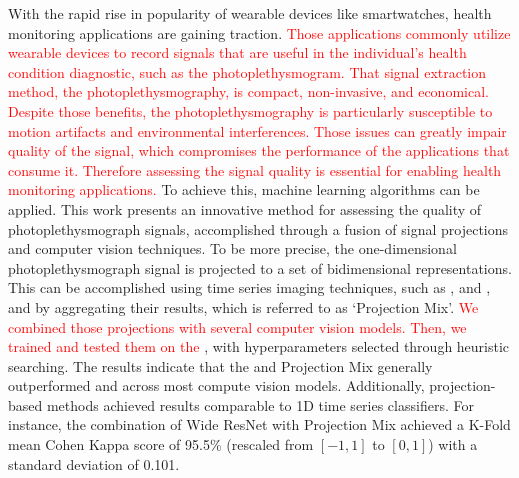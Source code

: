 
With the rapid rise in popularity of wearable devices like smartwatches, health monitoring applications are gaining traction. 
\textcolor{red}{Those applications commonly utilize wearable devices to record signals that are useful in the individual's health condition diagnostic, such as the photoplethysmogram. That signal extraction method, the photoplethysmography, is compact, non-invasive, and economical. Despite those benefits, the photoplethysmography is particularly susceptible to motion artifacts and environmental interferences. Those issues can greatly impair quality of the signal, which compromises the performance of the applications that consume it. Therefore  assessing the signal quality is essential for enabling health monitoring applications. }
%
To achieve this, machine learning algorithms can be applied. This work presents an innovative method for assessing the quality of photoplethysmograph signals, accomplished through a fusion of signal projections and computer vision techniques. To be more precise, the one-dimensional photoplethysmograph signal is projected to a set of bidimensional representations. This can be accomplished using time series imaging techniques, such as ,  and , and by aggregating their results, which is referred to as `Projection Mix'. \textcolor{red}{We combined those projections with several computer vision models. Then, we trained and tested them on the }, with hyperparameters selected through heuristic searching. The results indicate that the  and Projection Mix generally outperformed  and  across most compute vision models. Additionally, projection-based methods achieved results comparable to 1D time series classifiers. For instance, the combination of Wide ResNet with Projection Mix achieved a K-Fold mean Cohen Kappa score of 95.5\% (rescaled from $[-1,1]$ to $[0,1]$) with a standard deviation of 0.101. 
